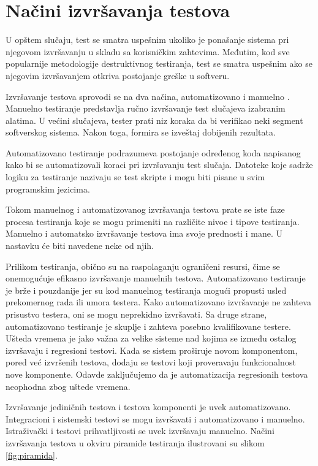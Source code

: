 \documentclass[12pt,oneside]{memoir}
\begin{document}
\section{Načini izvršavanja testova} \label{broj4}
U opštem slučaju, test se smatra uspešnim ukoliko je ponašanje sistema pri njegovom izvršavanju u skladu sa korisničkim zahtevima. Međutim, kod sve popularnije metodologije destruktivnog testiranja, test se smatra uspešnim ako se njegovim izvršavanjem otkriva postojanje greške u softveru.
\par
Izvršavanje testova sprovodi se na dva načina, automatizovano i manuelno \cite{AutomatedManualExecution}. Manuelno  testiranje predstavlja ručno izvršavanje test slučajeva izabranim alatima. 
U većini slučajeva, tester prati niz koraka da bi verifikao neki segment softverskog sistema. Nakon toga, formira se izveštaj dobijenih rezultata.
\par
Automatizovano testiranje podrazumeva postojanje određenog koda napisanog kako bi se automatizovali koraci pri izvršavanju test slučaja. 
Datoteke koje sadrže logiku za testiranje nazivaju se test skripte i mogu biti pisane u svim programskim jezicima. \par
Tokom manuelnog i automatizovanog izvršavanja testova prate se iste faze procesa testiranja koje se mogu primeniti na različite nivoe i tipove testiranja. Manuelno i automatsko izvršavanje testova ima svoje prednosti i mane. U nastavku će biti navedene neke od njih. 

Prilikom testiranja, obično su na raspolaganju ograničeni resursi, čime se onemogućuje efikasno izvršavanje manuelnih testova. Automatizovano testiranje je brže i pouzdanije jer su kod manuelnog testiranja mogući propusti usled prekomernog rada ili umora testera. Kako automatizovano izvršavanje ne zahteva prisustvo testera, oni se mogu neprekidno izvršavati.
Sa druge strane, automatizovano testiranje je skuplje i zahteva posebno kvalifikovane testere. Ušteda vremena je jako važna za velike sisteme nad kojima se između ostalog izvršavaju i regresioni testovi. Kada se sistem proširuje novom komponentom, pored već izvršenih testova, dodaju se testovi koji proveravaju funkcionalnost nove komponente. Odavde zaključujemo da je automatizacija regresionih testova neophodna zbog uštede vremena.

\par
Izvršavanje jediničnih testova i testova komponenti je uvek automatizovano. Integracioni i sistemski testovi se mogu izvršavati i automatizovano i manuelno. Istraživački i testovi prihvatljivosti se uvek izvršavaju manuelno. Načini izvršavanja testova u okviru piramide testiranja ilustrovani su slikom \ref{fig:piramida}.
\end{document}
